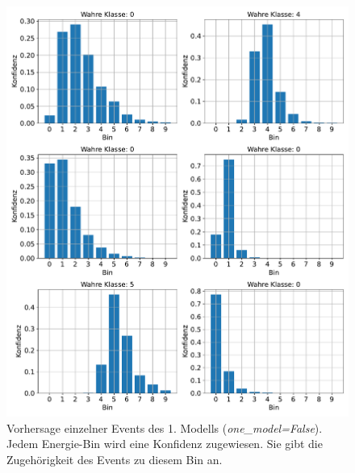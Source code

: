 \begin{figure}%
    \centering%
    \includegraphics[width=\textwidth]{Plots/DSEA/False/SingleEvents_10bins_75ep_500000samples_200pulls.pdf}%
    \caption[Vorhersage einzelner Events des 1. Modells in DSEA]{Vorhersage einzelner Events des 1. Modells (\textit{one\_model=False}).
    Jedem Energie-Bin wird eine Konfidenz zugewiesen.
    Sie gibt die Zugehörigkeit des Events zu diesem Bin an.
    }%
    \label{fig:dsea_single_events_false}%
\end{figure}%

